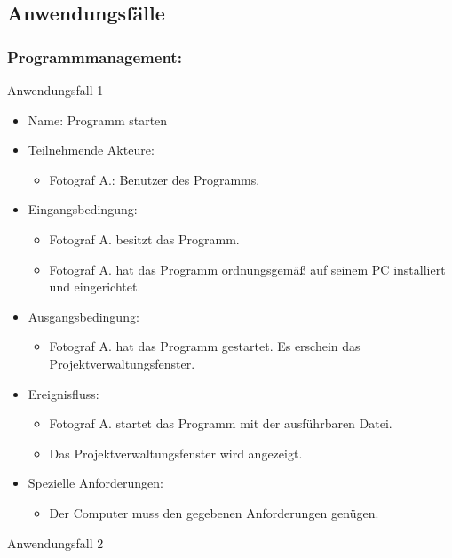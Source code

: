 \subsection{Anwendungsfälle}

	\subsubsection{Programmmanagement:}
	
	\begin{description}
	\item[Anwendungsfall 1]
	\end{description}
	
	\begin{itemize}
		\item Name: Programm starten
		\item Teilnehmende Akteure:
		\begin{itemize}
			\item	Fotograf A.: Benutzer des Programms.
		\end{itemize}
		\item Eingangsbedingung:
		\begin{itemize}
			\item Fotograf A. besitzt das Programm.
			\item Fotograf A. hat das Programm ordnungsgemäß auf seinem PC installiert und eingerichtet.						
		\end{itemize}
		\item Ausgangsbedingung:
		\begin{itemize}
			\item	Fotograf A. hat das Programm gestartet. Es erschein das Projektverwaltungsfenster.		
		\end{itemize}
		\item Ereignisfluss:	
		\begin{itemize}
			\item Fotograf A. startet das Programm mit der ausführbaren Datei.		
			\item Das Projektverwaltungsfenster wird angezeigt.
		\end{itemize}
		\item Spezielle Anforderungen:
		\begin{itemize}
			\item	Der Computer muss den gegebenen Anforderungen genügen.
		\end{itemize}
	\end{itemize}
	
	\begin{description}
	\item[Anwendungsfall 2]
	\end{description}
	
